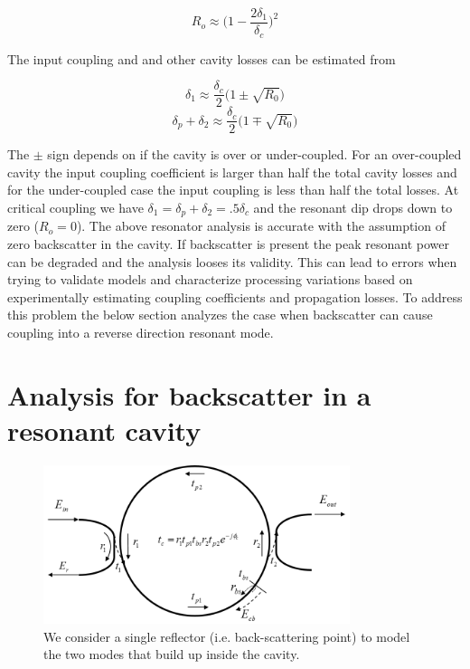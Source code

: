 \documentclass[10pt]{article}
\begin{document}
\begin{equation} 
R_o \approx \Big( 1 -  \frac{2 \delta_1}{\delta_c}       \Big)^2
\end{equation}

\noindent  The input coupling and and other cavity losses can be estimated from

\begin{equation} 
\delta_1 \approx \frac{\delta_c}{2} \big(1 \pm \sqrt{R_0} \big) 
\end{equation}
\begin{equation} 
\delta_p + \delta_2  \approx \frac{\delta_c}{2} \big(1 \mp \sqrt{R_0} \big) 
\end{equation}

\noindent  The $\pm$ sign depends on if the cavity is over or under-coupled. For an over-coupled cavity the input coupling coefficient is larger than half the total cavity losses and for the under-coupled case the input coupling is less than half the total losses. At critical coupling we have  $\delta_1 = \delta_p + \delta_2 = .5\delta_c$  and the resonant dip drops down to zero ($R_o = 0$).  
The above  resonator analysis is accurate with the assumption of zero backscatter in the cavity.  If backscatter is present the peak resonant power can be degraded and the analysis looses its validity.  This can lead to errors when trying to validate models and characterize processing variations based on experimentally estimating coupling coefficients and propagation losses.  To address this problem the below section analyzes the case when backscatter can cause coupling into a reverse direction resonant mode.  



\section{Analysis for backscatter in a resonant cavity}

\begin{figure}[htbp]
\centering\includegraphics[width=0.8\textwidth]{figures/bs_v3}
\caption{
We consider a single reflector (i.e. back-scattering point) to model the two modes that build up inside the cavity.
}
\label{fig:bs}
\end{figure}
\end{document}
